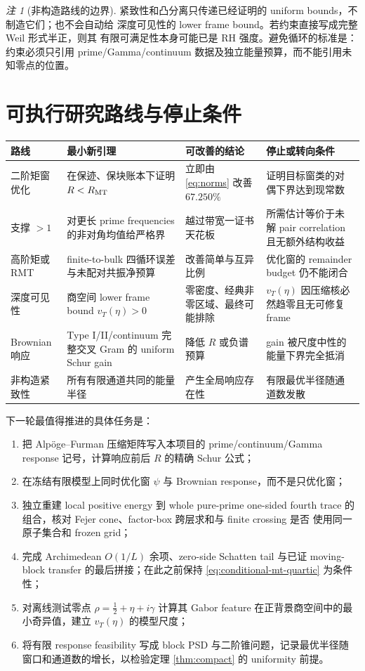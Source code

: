\documentclass[UTF8,11pt,a4paper]{ctexart}
\theoremstyle{definition}
\theoremstyle{remark}
\newtheorem{remark}[theorem]{注}
\begin{document}
\begin{remark}[非构造路线的边界]
紧致性和凸分离只传递已经证明的 uniform bounds，不制造它们；也不会自动给
深度可见性的 lower frame bound。若约束直接写成完整 Weil 形式半正，则其
有限可满足性本身可能已是 RH 强度。避免循环的标准是：约束必须只引用
prime/Gamma/continuum 数据及独立能量预算，而不能引用未知零点的位置。
\end{remark}

\section{可执行研究路线与停止条件}

\begin{longtable}{p{}p{}p{}p{}}
\toprule
路线 & 最小新引理 & 可改善的结论 & 停止或转向条件\\
\midrule
\endhead
二阶矩窗优化
& 在保迹、保块账本下证明 $R<R_{\rm MT}$
& 立即由 \eqref{eq:norms} 改善 $67.250\%$
& 证明目标窗类的对偶下界达到现常数\\
\addlinespace
支撑 $>1$
& 对更长 prime frequencies 的非对角均值给严格界
& 越过带宽一证书天花板
& 所需估计等价于未解 pair correlation 且无额外结构收益\\
\addlinespace
高阶矩或 RMT
& finite-to-bulk 四循环误差与未配对共振净预算
& 改善简单与互异比例
& 优化窗的 remainder budget 仍不能闭合\\
\addlinespace
深度可见性
& 商空间 lower frame bound $v_T(\eta)>0$
& 零密度、经典非零区域、最终可能排除
& $v_T(\eta)$ 因压缩核必然趋零且无可修复 frame\\
\addlinespace
Brownian 响应
& Type I/II/continuum 完整交叉 Gram 的 uniform Schur gain
& 降低 $R$ 或负谱预算
& gain 被尺度中性的能量下界完全抵消\\
\addlinespace
非构造紧致性
& 所有有限通道共同的能量半径
& 产生全局响应存在性
& 有限最优半径随通道数发散\\
\bottomrule
\end{longtable}

下一轮最值得推进的具体任务是：
\begin{enumerate}
\item 把 Alpöge--Furman 压缩矩阵写入本项目的
prime/continuum/Gamma response 记号，计算响应前后 $R$ 的精确 Schur 公式；
\item 在冻结有限模型上同时优化窗 $\psi$ 与 Brownian response，而不是只优化窗；
\item 独立重建 local positive energy 到 whole pure-prime one-sided fourth
trace 的组合，核对 Fejer cone、factor-box 跨层求和与 finite crossing 是否
使用同一原子集合和 frozen grid；
\item 完成 Archimedean $O(1/L)$ 余项、zero-side Schatten tail 与已证
moving-block transfer 的最后拼接；在此之前保持
\eqref{eq:conditional-mt-quartic} 为条件性；
\item 对离线测试零点 $\rho=\tfrac12+\eta+i\gamma$ 计算其 Gabor feature
在正背景商空间中的最小奇异值，建立 $v_T(\eta)$ 的模型尺度；
\item 将有限 response feasibility 写成 block PSD 与二阶锥问题，记录最优半径随
窗口和通道数的增长，以检验定理 \ref{thm:compact} 的 uniformity 前提。
\end{enumerate}
\end{document}
